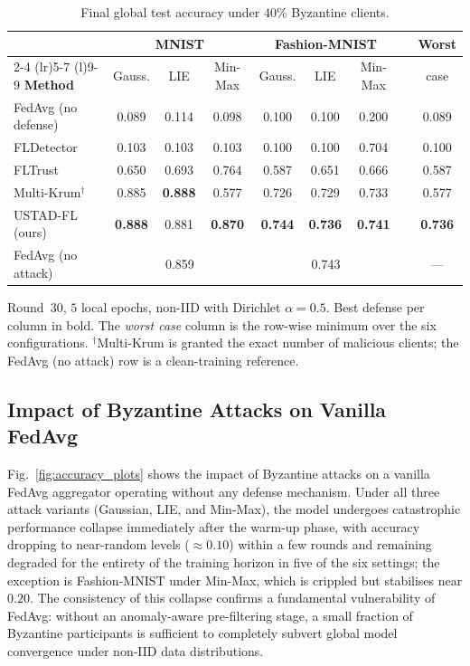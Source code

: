 \documentclass[journal]{IEEEtran}
\begin{document}
\begin{table}[!t]
\centering
\caption{Final global test accuracy under $40\%$ Byzantine clients.}
\label{tab:main_results}
\footnotesize
\setlength{\tabcolsep}{5pt}
\begin{tabular}{@{}lcccccc@{}cc@{}}
\toprule
& \multicolumn{3}{c}{\textbf{MNIST}} & \multicolumn{3}{c}{\textbf{Fashion-MNIST}} & & \multicolumn{1}{c}{\textbf{Worst}} \\
\cmidrule(lr){2-4} \cmidrule(lr){5-7} \cmidrule(l){9-9}
\textbf{Method} & Gauss. & LIE & Min-Max & Gauss. & LIE & Min-Max & & case \\
\midrule
FedAvg (no defense) & 0.089 & 0.114 & 0.098 & 0.100 & 0.100 & 0.200 & & 0.089 \\
FLDetector & 0.103 & 0.103 & 0.103 & 0.100 & 0.100 & 0.704 & & 0.100 \\
FLTrust & 0.650 & 0.693 & 0.764 & 0.587 & 0.651 & 0.666 & & 0.587 \\
Multi-Krum$^\dagger$ & 0.885 & \textbf{0.888} & 0.577 & 0.726 & 0.729 & 0.733 & & 0.577 \\
USTAD-FL (ours) & \textbf{0.888} & 0.881 & \textbf{0.870} & \textbf{0.744} & \textbf{0.736} & \textbf{0.741} & & \textbf{0.736} \\
\midrule
FedAvg (no attack) & \multicolumn{3}{c}{0.859} & \multicolumn{3}{c}{0.743} & & --- \\
\bottomrule
\end{tabular}

\vspace{2pt}
{\footnotesize \raggedright Round~$30$, $5$ local epochs, non-IID with Dirichlet $\alpha=0.5$. Best defense per column in bold. The \emph{worst case} column is the row-wise minimum over the six configurations. $^\dagger$Multi-Krum is granted the exact number of malicious clients; the FedAvg (no attack) row is a clean-training reference.\par}
\end{table}

\subsection{Impact of Byzantine Attacks on Vanilla FedAvg}

Fig.~\ref{fig:accuracy_plots} shows the impact of Byzantine attacks on a vanilla FedAvg aggregator operating without any defense mechanism. Under all three attack variants (Gaussian, LIE, and Min-Max), the model undergoes catastrophic performance collapse immediately after the warm-up phase, with accuracy dropping to near-random levels ($\approx 0.10$) within a few rounds and remaining degraded for the entirety of the training horizon in five of the six settings; the exception is Fashion-MNIST under Min-Max, which is crippled but stabilises near $0.20$. The consistency of this collapse confirms a fundamental vulnerability of FedAvg: without an anomaly-aware pre-filtering stage, a small fraction of Byzantine participants is sufficient to completely subvert global model convergence under non-IID data distributions.
\end{document}

